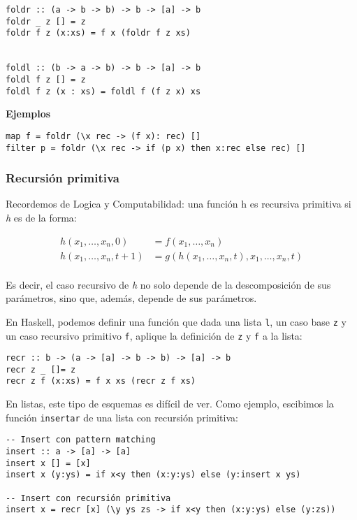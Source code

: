 \begin{centrado}
	\begin{verbatim}
foldr :: (a -> b -> b) -> b -> [a] -> b
foldr _ z [] = z
foldr f z (x:xs) = f x (foldr f z xs)
		
		
foldl :: (b -> a -> b) -> b -> [a] -> b
foldl f z [] = z
foldl f z (x : xs) = foldl f (f z x) xs
\end{verbatim}
\end{centrado}

\textbf{Ejemplos}

\begin{centrado}
	\begin{verbatim}
map f = foldr (\x rec -> (f x): rec) []
filter p = foldr (\x rec -> if (p x) then x:rec else rec) []
	\end{verbatim}
\end{centrado}


\subsubsection{Recursión primitiva}
Recordemos de Logica y Computabilidad: una función h es recursiva primitiva si \textit{h} es de la forma:

\begin{align*}
		h(x_1,\dots,x_n,0) &= f(x_1,\dots,x_n) \\
		h(x_1,\dots,x_n,t+1) &= g(h(x_1,\dots,x_n, t),x_1,\dots, x_n, t) \\
\end{align*}

Es decir, el caso recursivo de \textit{h} no solo depende de la descomposición de sus parámetros, sino que, además, depende de sus parámetros.

En Haskell, podemos definir una función que dada una lista \texttt{l}, un caso base \texttt{z} y un caso recursivo primitivo \texttt{f}, aplique la definición de \texttt{z} y \texttt{f} a la lista:
\begin{centrado}
	\begin{verbatim}
recr :: b -> (a -> [a] -> b -> b) -> [a] -> b
recr z _ []= z
recr z f (x:xs) = f x xs (recr z f xs)
	\end{verbatim}
\end{centrado}

En listas, este tipo de esquemas es difícil de ver. Como ejemplo, escibimos la función \texttt{insertar} de una lista con recursión primitiva:
\begin{centrado}
	\begin{verbatim}
-- Insert con pattern matching
insert :: a -> [a] -> [a]
insert x [] = [x]
insert x (y:ys) = if x<y then (x:y:ys) else (y:insert x ys)

-- Insert con recursión primitiva
insert x = recr [x] (\y ys zs -> if x<y then (x:y:ys) else (y:zs))
	\end{verbatim}
\end{centrado}

